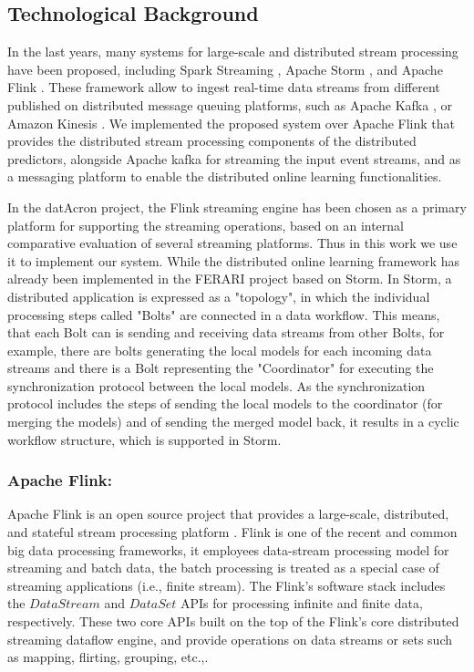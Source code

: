 \subsection{Technological Background}
In the last years, many systems for large-scale and distributed stream processing have been proposed, including Spark Streaming \cite{Spark},  Apache Storm \cite{Storm}, and Apache Flink \cite{Flink}. These framework allow to ingest real-time data streams from different published on distributed message queuing platforms, such as Apache Kafka \cite{Kafka}, or  Amazon Kinesis \cite{Kinesis}. We implemented the proposed system over Apache Flink that provides the distributed stream processing components of the distributed predictors, alongside  Apache kafka for streaming the input event streams, and as a messaging platform to enable the distributed online learning functionalities.


\par In the datAcron project, the Flink streaming engine has been chosen as a primary platform for supporting the streaming operations, based on an internal comparative evaluation of several streaming platforms. Thus in this work we use it to implement our system. While the distributed online learning framework has already been implemented in the FERARI project \cite{flouris2016ferari}  based on Storm. In Storm, a distributed application is expressed as a "topology", in which the individual processing steps called "Bolts" are connected
in a data workflow. This means, that each Bolt can is sending and receiving data streams from other Bolts, for example, there are bolts generating
the local models for each incoming data streams and there is a Bolt representing the "Coordinator" for executing the synchronization protocol between
the local models. As the synchronization protocol includes the steps of sending the local models to the coordinator (for merging the models) and of sending
the merged model back, it results in a cyclic workflow structure, which is supported in Storm. 

\subsubsection*{Apache Flink:\\}

\par Apache Flink is an open source project that provides a large-scale, distributed,  and stateful stream processing platform \cite{carbone2015apache}. Flink is one of the recent and common big data processing frameworks, it employees data-stream processing model for streaming and batch data, the batch processing is treated as a special case of streaming applications (i.e., finite stream). The Flink's software stack includes the  $DataStream$ and $DataSet$ APIs for processing infinite and finite data, respectively. These two core APIs built on the top of the Flink's core distributed streaming dataflow engine, and provide operations on data streams or sets such as mapping, flirting, grouping, etc.,.  

